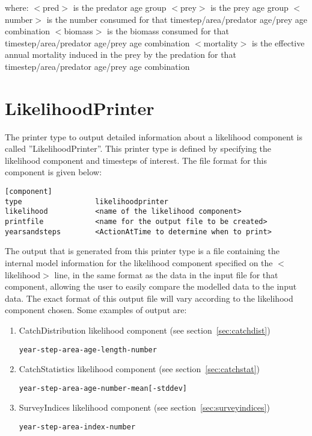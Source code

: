 \documentclass[10pt,twoside]{book}
\begin{document}
where:\newline
$<$pred$>$ is the predator age group\newline
$<$prey$>$ is the prey age group\newline
$<$number$>$ is the number consumed for that timestep/area/predator age/prey age combination\newline
$<$biomass$>$ is the biomass consumed for that timestep/area/predator age/prey age combination\newline
$<$mortality$>$ is the effective annual mortality induced in the prey by the predation for that timestep/area/predator age/prey age combination

\section{LikelihoodPrinter}\label{sec:likelihoodprinter}
The printer type to output detailed information about a likelihood component is called ''LikelihoodPrinter''.  This printer type is defined by specifying the likelihood component and timesteps of interest.  The file format for this component is given below:

{\small\begin{verbatim}
[component]
type                 likelihoodprinter
likelihood           <name of the likelihood component>
printfile            <name for the output file to be created>
yearsandsteps        <ActionAtTime to determine when to print>
\end{verbatim}}

The output that is generated from this printer type is a file containing the internal model information for the likelihood component specified on the $<$likelihood$>$ line, in the same format as the data in the input file for that component, allowing the user to easily compare the modelled data to the input data.  The exact format of this output file will vary according to the likelihood component chosen.  Some examples of output are:

\begin{enumerate}
\item CatchDistribution likelihood component (see section~\ref{sec:catchdist})
{\small\begin{verbatim}
year-step-area-age-length-number
\end{verbatim}}
\item CatchStatistics likelihood component (see section~\ref{sec:catchstat})
{\small\begin{verbatim}
year-step-area-age-number-mean[-stddev]
\end{verbatim}}
\item SurveyIndices likelihood component (see section~\ref{sec:surveyindices})
{\small\begin{verbatim}
year-step-area-index-number
\end{verbatim}}
\end{enumerate}
\end{document}
